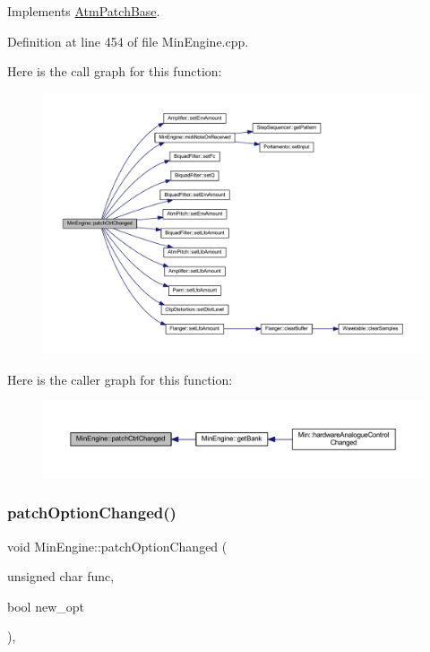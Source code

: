 Implements \hyperlink{class_atm_patch_base_a10abe1d35a241d61a83473ef8caaee33}{Atm\+Patch\+Base}.



Definition at line 454 of file Min\+Engine.\+cpp.

Here is the call graph for this function\+:
\nopagebreak
\begin{figure}[H]
\begin{center}
\leavevmode
\includegraphics[width=350pt]{class_min_engine_ad26e5e985eb56946ae93dc3274874229_cgraph}
\end{center}
\end{figure}
Here is the caller graph for this function\+:
\nopagebreak
\begin{figure}[H]
\begin{center}
\leavevmode
\includegraphics[width=350pt]{class_min_engine_ad26e5e985eb56946ae93dc3274874229_icgraph}
\end{center}
\end{figure}
\mbox{\label{class_min_engine_aff5a85aae7d6f6e5edd571c73c071871}} 
\subsubsection{\texorpdfstring{patch\+Option\+Changed()}{patchOptionChanged()}}
{\footnotesize\ttfamily void Min\+Engine\+::patch\+Option\+Changed (\begin{DoxyParamCaption}\item[{unsigned char}]{func,  }\item[{bool}]{new\+\_\+opt }\end{DoxyParamCaption})\hspace{0.3cm}{\ttfamily [inline]}, {\ttfamily [virtual]}}



